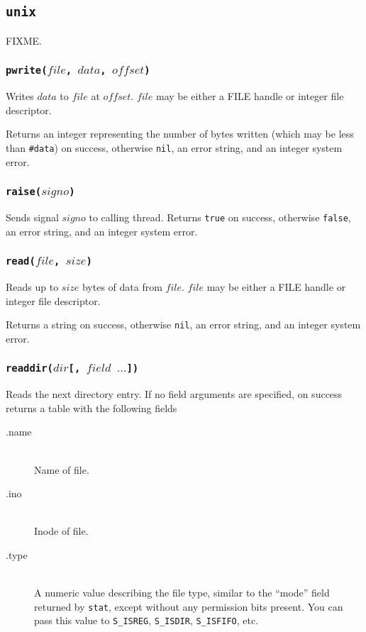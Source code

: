 \documentclass[11pt, oneside]{memoir}
\newcommand*{\true}[0]{\texttt{true}\xspace}
\newcommand*{\false}[0]{\texttt{false}\xspace}
\newcommand*{\nil}[0]{\texttt{nil}\xspace}
\newcommand*{\syscall}[1]{\texttt{#1}\xspace}
\newcommand*{\fn}[1]{\texttt{#1}\xspace}
\newcommand*{\otherwise}[1]{otherwise #1, an error string, and an integer system error}
\newcounter{toccols}
\newenvironment{Module}[1]{
	\subsection{\texttt{#1}}
	\addtocontents{toc}{
		\protect\begin{multicols}{\value{toccols}}
	}
}{
	\addtocontents{toc}{\protect\end{multicols}}
}
\begin{document}
\begin{Module}{unix}
FIXME.

\subsubsection[\fn{pwrite}]{\fn{pwrite($file$, $data$, $offset$)}}

Writes $data$ to $file$ at $offset$. $file$ may be either a FILE handle or integer file descriptor.

Returns an integer representing the number of bytes written (which may be less than \texttt{\#data}) on success, \otherwise{\nil}.

\subsubsection[\fn{raise}]{\fn{raise($signo$)}}

Sends signal $signo$ to calling thread. Returns \true on success, otherwise \false, an error string, and an integer system error.

\subsubsection[\fn{read}]{\fn{read($file$, $size$)}}

Reads up to $size$ bytes of data from $file$. $file$ may be either a FILE handle or integer file descriptor.

Returns a string on success, \otherwise{\nil}.

\subsubsection[\fn{readdir}]{\fn{readdir($dir$[, $field$ $\ldots$])}}

Reads the next directory entry. If no field arguments are specified, on success returns a table with the following fields

\begin{description}
\item[.name] \hfill \\
Name of file.
\item[.ino] \hfill \\
Inode of file.
\item[.type] \hfill \\
A numeric value describing the file type, similar to the ``mode'' field returned by \syscall{stat}, except without any permission bits present. You can pass this value to \fn{S\_ISREG}, \fn{S\_ISDIR}, \fn{S\_ISFIFO}, etc.


\end{description}
\end{Module}
\end{document}

